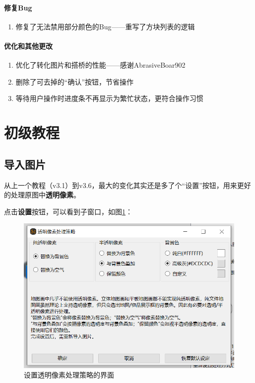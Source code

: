 \documentclass[UTF8]{ctexart}
\begin{document}
    \paragraph{修复Bug}
    \begin{enumerate}
        \item 修复了无法禁用部分颜色的Bug——重写了方块列表的逻辑 
    \end{enumerate}
    \paragraph{优化和其他更改}
    \begin{enumerate}        
        \item 优化了转化图片和搭桥的性能——感谢AbrasiveBoar902
        \item 删除了可去掉的“确认”按钮，节省操作
        \item 等待用户操作时进度条不再显示为繁忙状态，更符合操作习惯
    \end{enumerate}

    \pagebreak
    \section{初级教程}
    \subsection{导入图片}
    从上一个教程（v3.1）到v3.6，最大的变化其实还是多了个“设置”按钮，用来更好的处理原图中\textbf{透明像素}。
 
    点击\textbf{设置}按钮，可以看到子窗口，如图\ref*{SetTPS}：

    \begin{figure}[htbp]
        \centering
        \includegraphics[width=15cm]{Img1_TPS.png}
        \caption{设置透明像素处理策略的界面}
        \label{SetTPS}
    \end{figure}
    
\end{document}
